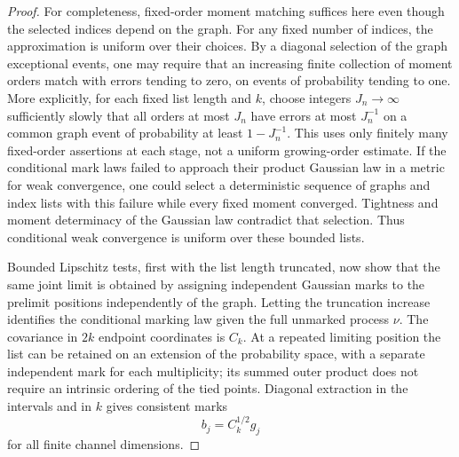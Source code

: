 \begin{proof}
For completeness, fixed-order moment matching suffices here even
though the selected indices depend on the graph. For any fixed
number of indices, the approximation is uniform over their choices.
By a diagonal selection of the graph exceptional events, one may
require that an increasing finite collection of moment orders match
with errors tending to zero, on events of probability tending to one.
More explicitly, for each fixed list length and \(k\), choose integers
\(J_n\to\infty\) sufficiently slowly that all orders at most \(J_n\)
have errors at most \(J_n^{-1}\) on a common graph event of probability
at least \(1-J_n^{-1}\). This uses only finitely many fixed-order
assertions at each stage, not a uniform growing-order estimate.
If the conditional mark laws failed to approach their product
Gaussian law in a metric for weak convergence, one could select a
deterministic sequence of graphs and index lists with this failure
while every fixed moment converged. Tightness and moment
determinacy of the Gaussian law contradict that selection.
Thus conditional weak convergence is uniform over these bounded
lists.

Bounded Lipschitz tests, first with the list length truncated, now
show that the same joint limit is obtained by assigning independent
Gaussian marks to the prelimit positions independently of the graph.
Letting the truncation increase identifies the conditional marking
law given the full unmarked process \(\nu\). The covariance in
\(2k\) endpoint coordinates is \(C_k\). At a repeated limiting
position the list can be retained on an extension of the probability
space, with a separate independent mark for each multiplicity;
its summed outer product does not require an intrinsic ordering of
the tied points. Diagonal extraction in the intervals and in \(k\)
gives consistent marks
\begin{equation}\label{eq:lim-gaussian-marks}
 b_j=C_k^{1/2}g_j
\end{equation}
for all finite channel dimensions.


\end{proof}
